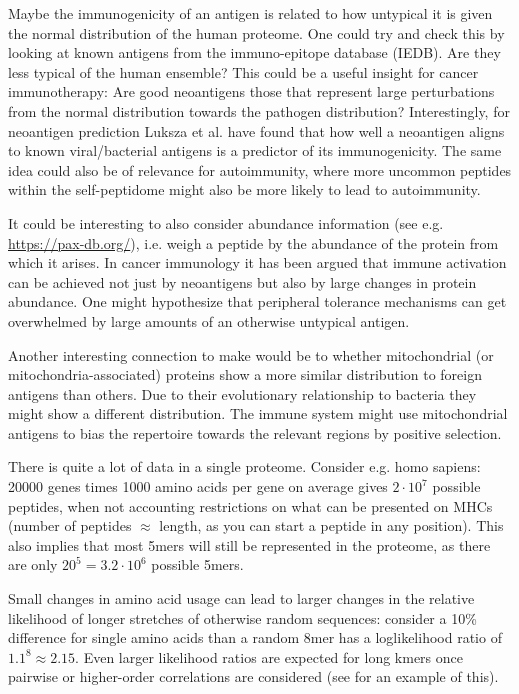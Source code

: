 \documentclass[superscriptaddress,twocolumn,pre]{revtex4}
\newcommand{\<}{\langle}
\renewcommand{\>}{\rangle}
\begin{document}
Maybe the immunogenicity of an antigen is related to how untypical it is given the normal distribution of the human proteome. One could try and check this by looking at known antigens from the immuno-epitope database (IEDB). Are they less typical of the human ensemble? This could be a useful insight for cancer immunotherapy: Are good neoantigens those that represent large perturbations from the normal distribution towards the pathogen distribution? Interestingly, for neoantigen prediction Luksza et al. \cite{Luksza2017} have found that how well a neoantigen aligns to known viral/bacterial antigens is a predictor of its immunogenicity. The same idea could also be of relevance for autoimmunity, where more uncommon peptides within the self-peptidome might also be more likely to lead to autoimmunity.

It could be interesting to also consider abundance information (see e.g. \url{https://pax-db.org/}), i.e. weigh a peptide by the abundance of the protein from which it arises. In cancer immunology \cite{Walz2015} it has been argued that immune activation can be achieved not just by neoantigens but also by large changes in protein abundance. One might hypothesize that peripheral tolerance mechanisms can get overwhelmed by large amounts of an otherwise untypical antigen.

Another interesting connection to make would be to whether mitochondrial (or mitochondria-associated) proteins show a more similar distribution to foreign antigens than others. Due to their evolutionary relationship to bacteria they might show a different distribution. The immune system might use mitochondrial antigens to bias the repertoire towards the relevant regions by positive selection.

There is quite a lot of data in a single proteome. Consider e.g. homo sapiens: 20000 genes times 1000 amino acids per gene on average gives $2 \cdot 10^7$ possible peptides, when not accounting restrictions on what can be presented on MHCs (number of peptides $\approx$ length, as you can start a peptide in any position). This also implies that most 5mers will still be represented in the proteome, as there are only $20^5 = 3.2 \cdot 10^6$ possible 5mers.

Small changes in amino acid usage can lead to larger changes in the relative likelihood of longer stretches of otherwise random sequences: consider a 10\% difference for single amino acids than a random 8mer has a loglikelihood ratio of $1.1^8 \approx 2.15$. Even larger likelihood ratios are expected for long kmers once pairwise or higher-order correlations are considered (see \cite{Schneidman2006} for an example of this).
\end{document}
